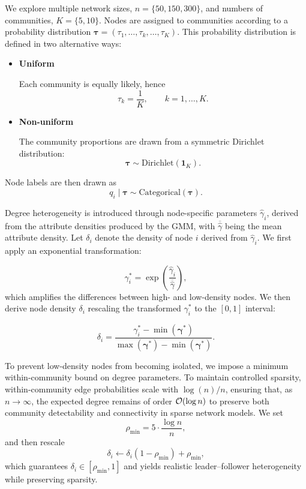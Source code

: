 \documentclass[11pt]{article}
\begin{document}
\setcounter{table}{0}
\renewcommand{\thetable}{A\arabic{table}}

We explore multiple network sizes, $n = \{50, 150, 300\}$, and numbers of communities, $K = \{5, 10 \}$. 
Nodes are assigned to communities according to a probability distribution
$\boldsymbol{\tau} = (\tau_1, \ldots, \tau_k, \ldots, \tau_K)$. This probability distribution is defined in two alternative ways:

\begin{itemize}
    \item \textbf{Uniform}

    Each community is equally likely, hence
    $$\tau_k = \frac{1}{K}, \qquad k = 1,\ldots,K.$$

    \item \textbf{Non-uniform}

    The community proportions are drawn from a symmetric Dirichlet distribution:
    $$\boldsymbol{\tau} \sim \mathrm{Dirichlet}(\mathbf{1}_K).$$
\end{itemize}


Node labels are then drawn as
    $$q_i \mid \boldsymbol{\tau} \sim \mathrm{Categorical}(\boldsymbol{\tau}).$$

Degree heterogeneity is introduced through node-specific parameters
$\hat\gamma_i$, derived from the attribute densities produced by the GMM, with $\overline{\hat\gamma}$ being the mean attribute density.
Let $\delta_i$ denote the density of node $i$ derived from $\hat\gamma_i$.
We first apply an exponential transformation:

$$
\gamma^{*}_i = \exp\!\left(\frac{\hat\gamma_i}{{\overline{\hat\gamma}}}\right),
$$
which amplifies the differences between high- and low-density nodes.
We then derive node density $\delta_i$ rescaling the transformed $\gamma^{*}_i$ to the $[0,1]$ interval:

$$
\delta_i = 
\frac{\gamma^{*}_i - \min(\bm\gamma^{*})}{\max(\bm\gamma^{*}) - \min(\bm\gamma^{*})}.
$$

To prevent low-density nodes from becoming isolated, we impose a minimum within-community bound on degree parameters. To maintain controlled sparsity, within-community edge probabilities scale with $\log(n)/n$, ensuring that, as $n\to\infty$, the expected degree remains of order ${\cal O}(\log n)$ to preserve both community detectability and connectivity in sparse network models. We set
$$
\rho_{\min} = 5 \cdot \frac{\log n}{n},
$$
and then rescale
$$
\delta_i \leftarrow \delta_i(1 - \rho_{\min}) + \rho_{\min},
$$
which guarantees $\delta_i \in [\rho_{\min},1]$ and yields realistic leader–follower heterogeneity while preserving sparsity.
\end{document}
